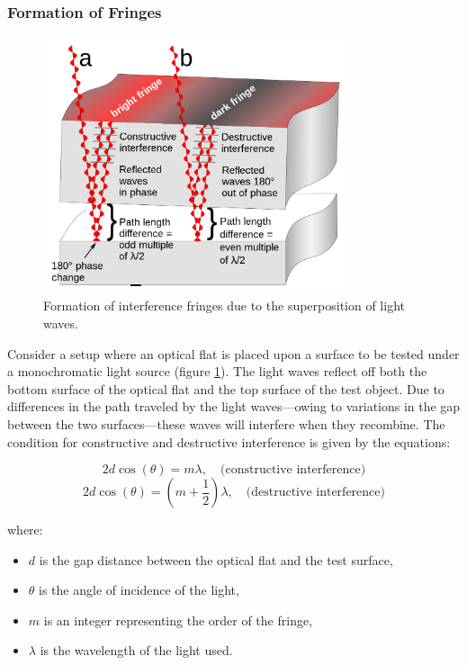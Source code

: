 \documentclass[../main.tex]{subfiles}
\begin{document}
\subsubsection{Formation of Fringes}
\begin{frame}{}
    \begin{figure}[H]
        \centering
        \includegraphics[width=0.8\textwidth]{Images/Introduction/Optical_flat_interference}
        \caption{Formation of interference fringes due to the superposition of light waves.\cite{enwiki:1212101911}}
        \label{fig:interference_fringes}
    \end{figure}
\end{frame}
Consider a setup where an optical flat is placed upon a surface to be tested under a monochromatic light source (figure \ref{fig:interference_fringes}). The light waves reflect off both the bottom surface of the optical flat and the top surface of the test object. Due to differences in the path traveled by the light waves—owing to variations in the gap between the two surfaces—these waves will interfere when they recombine. The condition for constructive and destructive interference is given by the equations:

\begin{equation}
2d \cos(\theta) = m\lambda, \quad \text{(constructive interference)}
\end{equation}
\begin{equation}
2d \cos(\theta) = (m + \frac{1}{2})\lambda, \quad \text{(destructive interference)}
\end{equation}

where:
\begin{itemize}
    \item \(d\) is the gap distance between the optical flat and the test surface,
    \item \(\theta\) is the angle of incidence of the light,
    \item \(m\) is an integer representing the order of the fringe,
    \item \(\lambda\) is the wavelength of the light used.
\end{itemize}
\end{document}
